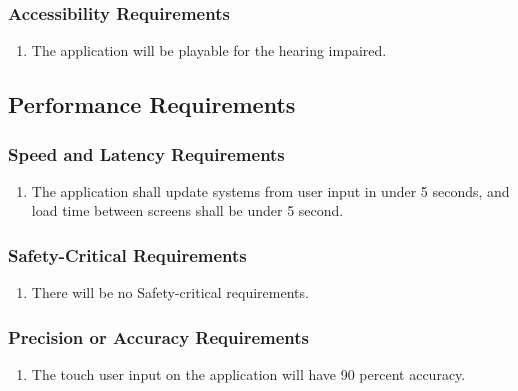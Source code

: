 \documentclass[12pt, titlepage]{article}
\begin{document}
\subsubsection{Accessibility Requirements}
\label{ssub:accessibility_requirements}
\begin{enumerate}[{UH}1. ]
	\item The application will be playable for the hearing impaired.
\end{enumerate}


\subsection{Performance Requirements}
\label{sub:performance_requirements}

\subsubsection{Speed and Latency Requirements}
\label{ssub:speed_and_latency_requirements}
\begin{enumerate}[{PR}1. ]
	\item The application shall update systems from user input in under 5 seconds, and load time between screens shall be under 5 second.
\end{enumerate}

\subsubsection{Safety-Critical Requirements}
\label{ssub:safety_critical_requirements}
\begin{enumerate}[{PR}1. ]
	\item There will be no Safety-critical requirements.
\end{enumerate}

\subsubsection{Precision or Accuracy Requirements}
\label{ssub:precision_or_accuracy_requirements}
\begin{enumerate}[{PR}1. ]
	\item The touch user input on the application will have 90 percent accuracy.
\end{enumerate}
\end{document}
